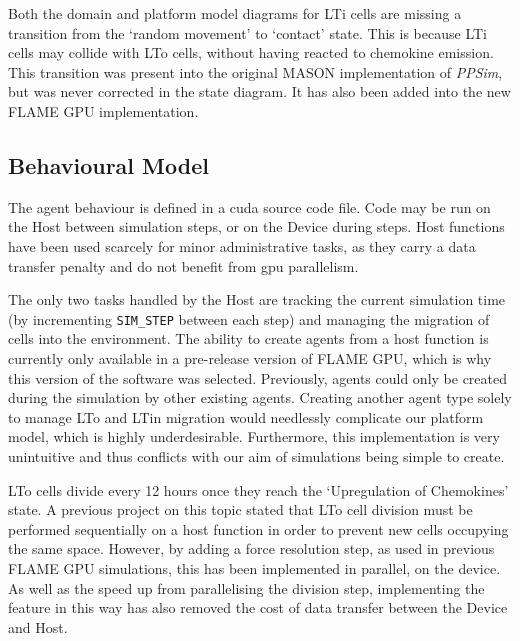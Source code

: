 \documentclass{UoYCSproject}
\begin{document}
\label{missing_link}
Both the domain and platform model diagrams for \gls{LTi} cells are missing a transition from the `random movement' to `contact' state.
This is because \gls{LTi} cells may collide with \gls{LTo} cells, without having reacted to chemokine emission.
This transition was present into the original \gls{MASON} implementation of \textit{PPSim}, but was never corrected in the state diagram.
It has also been added into the new \gls{FLAME GPU} implementation.

\subsection{Behavioural Model}
The agent behaviour is defined in a \gls{cuda} source code file.
Code may be run on the \gls{Host} between simulation steps, or on the \gls{Device} during steps.
\gls{Host} functions have been used scarcely for minor administrative tasks, as they carry a data transfer penalty and do not benefit from \gls{gpu} parallelism.

The only two tasks handled by the \gls{Host} are tracking the current simulation time (by incrementing \texttt{SIM\_STEP} between each step) and managing the migration of cells into the environment.
The ability to create agents from a host function is currently only available in a pre-release version of \gls{FLAME GPU}, which is why this version of the software was selected.
Previously, agents could only be created during the simulation by other existing agents.
Creating another agent type solely to manage \gls{LTo} and \gls{LTin} migration would needlessly complicate our platform model, which is highly underdesirable.
Furthermore, this implementation is very unintuitive and thus conflicts with our aim of simulations being simple to create.

\gls{LTo} cells divide every 12 hours once they reach the `Upregulation of Chemokines' state.
A previous project on this topic stated that \gls{LTo} cell division must be performed sequentially on a host function in order to prevent new cells occupying the same space\cite{phil_diss}.
However, by adding a force resolution step, as used in previous \gls{FLAME GPU} simulations\cite{flame_keratinocyte}, this has been implemented in parallel, on the device.
As well as the speed up from parallelising the division step, implementing the feature in this way has also removed the cost of data transfer between the \gls{Device} and \gls{Host}.
\end{document}
